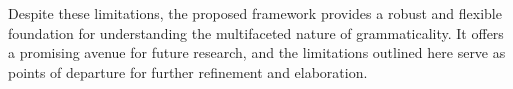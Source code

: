 \documentclass[12pt,letterpaper]{article}
\newcommand{\mention}[1]{\textit{#1}}
\begin{document}

Despite these limitations, the proposed framework provides a robust and flexible foundation for understanding the multifaceted nature of grammaticality. It offers a promising avenue for future research, and the limitations outlined here serve as points of departure for further refinement and elaboration.





\end{document}
